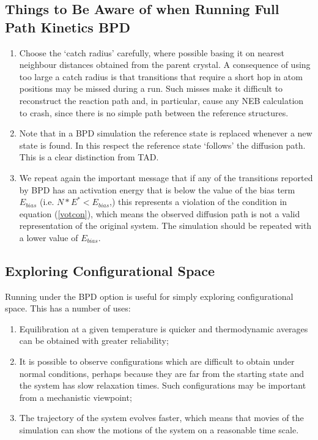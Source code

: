 \subsection{Things to Be Aware of when Running  Full Path Kinetics BPD}

\begin{enumerate}
\item Choose the `catch radius' carefully, where possible basing it on
  nearest neighbour distances obtained from the parent crystal. A
  consequence of using too large a catch radius is that transitions
  that require a short hop in atom positions may be missed during a
  run. Such misses make it difficult to reconstruct the reaction path
  and, in particular, cause any NEB calculation to crash, since there
  is no simple path between the reference structures.
\item Note that in a BPD simulation the reference state is replaced
  whenever a new state is found. In this respect the reference state
  `follows' the diffusion path. This is a clear distinction from TAD.
\item We repeat again the important message that if any of the 
  transitions reported by BPD has an activation energy that is below
  the value of the bias term $E_{bias}$
  (i.e. $N*E^{*}<E_{bias}$,) this represents a violation of the
  condition in equation (\ref{votcon}), which means the observed
  diffusion path is not a valid representation of the original
  system. The simulation should be repeated with a lower value of
  $E_{bias}$.
\end{enumerate}

\subsection{Exploring Configurational Space}
\label{cfgdyn}
Running \D{} under the BPD option is useful for simply exploring
configurational space. This has a number of uses:
\begin{enumerate}
\item Equilibration at a given temperature is quicker and
 thermodynamic averages can be obtained with greater reliability;
\item It is possible to observe configurations which are
 difficult to obtain under normal conditions, perhaps because they are
 far from the starting state and the system has slow relaxation
 times. Such configurations may be important from a mechanistic
 viewpoint;
\item The trajectory of the system evolves faster, which means that
 movies of the simulation can show the motions of the system on a
 reasonable time scale.
\end{enumerate}

